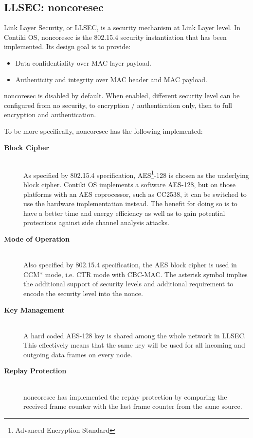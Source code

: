 \subsection{LLSEC: noncoresec}
Link Layer Security, or LLSEC, is a security mechanism at Link Layer level. In Contiki OS, noncoresec is the 802.15.4 security instantiation that has been implemented. Its design goal is to provide:
\begin{itemize}
\item Data confidentiality over MAC layer payload.
\item Authenticity and integrity over MAC header and MAC payload.
\end{itemize}

noncoresec is disabled by default. When enabled, different security level can be configured from no security, to encryption / authentication only, then to full encryption and authentication.

To be more specifically, noncoresec has the following implemented:

\begin{description}
\item[\textbf{Block Cipher}] \hfill \\
As specified by 802.15.4 specification, AES\footnote{Advanced Encryption Standard\cite{AES}}-128 is chosen as the underlying block cipher. Contiki OS implements a software AES-128, but on those platforms with an AES coprocessor, such as CC2538, it can be switched to use the hardware implementation instead. The benefit for doing so is to have a better time and energy efficiency as well as to gain potential protections against side channel analysis attacks.

\item[\textbf{Mode of Operation}] \hfill \\
Also specified by 802.15.4 specification, the AES block cipher is used in CCM* mode, i.e. CTR mode with CBC-MAC. The asterisk symbol implies the additional support of security levels and additional requirement to encode the security level into the nonce.

\item[\textbf{Key Management}] \hfill \\
 A hard coded AES-128 key is shared among the whole network in LLSEC. This effectively means that the same key will be used for all incoming and outgoing data frames on every node.
 
\item[\textbf{Replay Protection}] \hfill \\
noncoresec has implemented the replay protection by comparing the received frame counter with the last frame counter from the same source.
\end{description}

